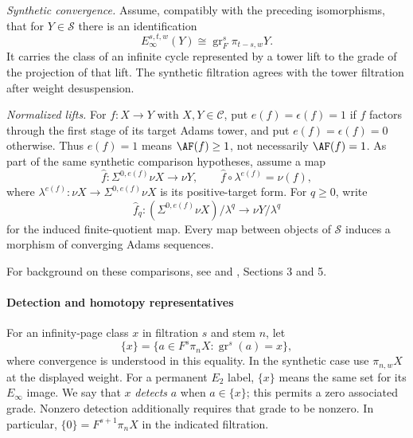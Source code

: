 \begin{definition}
\emph{Synthetic convergence.} Assume, compatibly with the preceding
isomorphisms, that for $Y\in\mathcal S$ there is an identification
\[
 E_\infty^{s,t,w}(Y)\cong\operatorname{gr}_F^s\pi_{t-s,w}Y.
\]
It carries the class of an infinite cycle represented by a tower lift
to the grade of the projection of that lift. The synthetic filtration
agrees with the tower filtration after weight desuspension.

\emph{Normalized lifts.} For $f:X\to Y$ with $X,Y\in\mathcal C$, put
$e(f)=\epsilon(f)=1$ if $f$ factors through the first stage of its
target Adams tower, and put $e(f)=\epsilon(f)=0$ otherwise. Thus
$e(f)=1$ means $\AF(f)\ge1$, not necessarily $\AF(f)=1$.
As part of the same synthetic comparison hypotheses, assume a map
\[
 \widehat f:\Sigma^{0,e(f)}\nu X\longrightarrow\nu Y,
 \qquad \widehat f\circ\lambda^{e(f)}=\nu(f),
\]
where $\lambda^{e(f)}:\nu X\to\Sigma^{0,e(f)}\nu X$ is its
positive-target form. For $q\ge0$, write
\[
 \widehat f_q:(\Sigma^{0,e(f)}\nu X)/\lambda^q
       \longrightarrow\nu Y/\lambda^q
\]
for the induced finite-quotient map. Every map between objects of
$\mathcal S$ induces a morphism of converging Adams sequences.

For background on these comparisons, see \cite{Pst} and
\cite{LWX126}, Sections 3 and 5.
\end{definition}


\paragraph*{Detection and homotopy representatives}
For an infinity-page class $x$ in filtration $s$ and stem $n$, let
\[
 \{x\}=\{a\in F^s\pi_nX:\operatorname{gr}^s(a)=x\},
\]
where convergence is understood in this equality. In the synthetic case
use $\pi_{n,w}X$ at the displayed weight. For a permanent $E_2$ label,
$\{x\}$ means the same set for its $E_\infty$ image. We say that $x$
\emph{detects} $a$ when $a\in\{x\}$; this permits a zero associated
grade. Nonzero detection additionally requires that grade to be nonzero.
In particular, $\{0\}=F^{s+1}\pi_nX$ in the indicated filtration.

